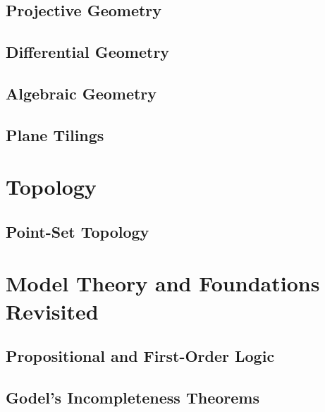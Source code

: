 \documentclass[oneside,openany]{book}
\theoremstyle{definition}
\begin{document}
\chapter{Projective Geometry}


\chapter{Differential Geometry}


\chapter{Algebraic Geometry}


\chapter{Plane Tilings}



\part{Topology}
\chapter{Point-Set Topology}



\part{Model Theory and Foundations Revisited}

\chapter{Propositional and First-Order Logic}


\chapter{Godel's Incompleteness Theorems}

\end{document}
